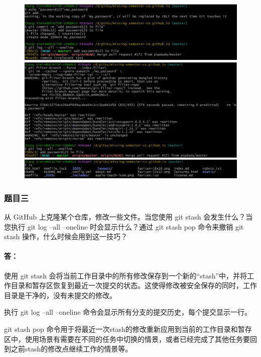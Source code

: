 \documentclass[a4paper, 12pt]{article}
\begin{document}
	\begin{figure}[H]
		\centering
		\includegraphics[width=1\textwidth]{006.jpg}
		\includegraphics[width=1\textwidth]{007.jpg}
		\includegraphics[width=1\textwidth]{008.jpg}
	\end{figure}
	
	\subsubsection{题目三}
	从 GitHub 上克隆某个仓库，修改一些文件。当您使用 git stash 会发生什么？当您执行 git log --all --oneline 时会显示什么？通过 git stash pop 命令来撤销 git stash 操作，什么时候会用到这一技巧？
	
	\paragraph{答：}
	
	使用 git stash 会将当前工作目录中的所有修改保存到一个新的“stash”中，并将工作目录和暂存区恢复到最近一次提交的状态。这使得修改被安全保存的同时，工作目录是干净的，没有未提交的修改。
	
	执行 git log --all --oneline 命令会显示所有分支的提交历史，每个提交显示一行。
	
	git stash pop 命令用于将最近一次stash的修改重新应用到当前的工作目录和暂存区中，使用场景有需要在不同的任务中切换的情景，或者已经完成了其他任务要回到之前stash的修改点继续工作的情景等。
	
\end{document}
